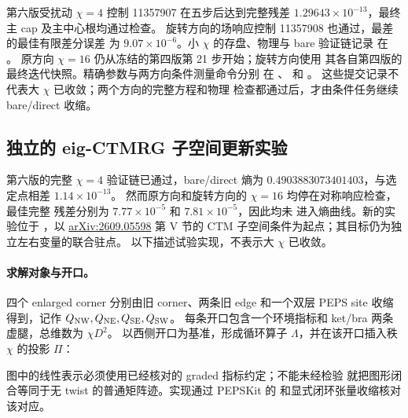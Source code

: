 第六版受扰动 $\chi=4$ 控制 11357907 在五步后达到完整残差
$1.29643\times10^{-13}$，最终主 cap 及主中心根均通过检查。
旋转方向的场响应控制 11357908 也通过，最差的最佳有限差分误差
为 $9.07\times10^{-6}$。小 $\chi$ 的存盘、物理与 bare 验证链记录
在 。
原方向 $\chi=16$ 仍从冻结的第四版第 21 步开始；旋转方向使用
其各自第四版的最终迭代快照。精确参数与两方向条件测量命令分别
在 、
 和
。
这些提交记录不代表大 $\chi$ 已收敛；两个方向的完整方程和物理
检查都通过后，才由条件任务继续 bare/direct 收缩。

\subsection{独立的 eig-CTMRG 子空间更新实验}
\label{sec:eigctm-pilot}

第六版的完整 $\chi=4$ 验证链已通过，bare/direct 熵为
$0.4903883073401403$，与选定点相差 $1.14\times10^{-13}$。
然而原方向和旋转方向的 $\chi=16$ 均停在对称响应检查，最佳完整
残差分别为 $7.77\times10^{-5}$ 和 $7.81\times10^{-5}$，因此均未
进入熵曲线。新的实验位于 ，以
\href{https://arxiv.org/pdf/2609.05598}{arXiv:2609.05598}
第 V 节的 CTM 子空间条件为起点；其目标仍为独立左右变量的联合驻点。
以下描述试验实现，不表示大 $\chi$ 已收敛。

\paragraph{求解对象与开口。}
四个 enlarged corner 分别由旧 corner、两条旧 edge 和一个双层
PEPS site 收缩得到，记作 $Q_{\rm NW},Q_{\rm NE},Q_{\rm SE},Q_{\rm SW}$。
每条开口包含一个环境指标和 ket/bra 两条虚腿，总维数为 $\chi D^2$。
以西侧开口为基准，形成循环算子 $\Lambda$，并在该开口插入秩
$\chi$ 的投影 $\Pi$：
\begin{center}
\end{center}
图中的线性表示必须使用已经核对的 graded 指标约定；不能未经检验
就把图形闭合等同于无 twist 的普通矩阵迹。实现通过 PEPSKit 的
 和显式闭环张量收缩核对该对应。

